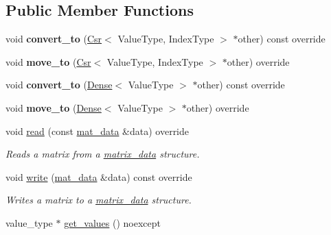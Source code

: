 \subsection*{Public Member Functions}
\begin{DoxyCompactItemize}
\item 
\mbox{\label{classgko_1_1matrix_1_1Coo_a209277e9e7c7fe02c810524f758b96e0}} 
void {\bfseries convert\+\_\+to} (\hyperlink{classgko_1_1matrix_1_1Csr}{Csr}$<$ Value\+Type, Index\+Type $>$ $\ast$other) const override
\item 
\mbox{\label{classgko_1_1matrix_1_1Coo_a69d13086e01d54027191308f01fe7853}} 
void {\bfseries move\+\_\+to} (\hyperlink{classgko_1_1matrix_1_1Csr}{Csr}$<$ Value\+Type, Index\+Type $>$ $\ast$other) override
\item 
\mbox{\label{classgko_1_1matrix_1_1Coo_afe1da5bbb43e64ced415d90b68e5d87d}} 
void {\bfseries convert\+\_\+to} (\hyperlink{classgko_1_1matrix_1_1Dense}{Dense}$<$ Value\+Type $>$ $\ast$other) const override
\item 
\mbox{\label{classgko_1_1matrix_1_1Coo_a0c4d89bb25548925ca9e698bdf00a946}} 
void {\bfseries move\+\_\+to} (\hyperlink{classgko_1_1matrix_1_1Dense}{Dense}$<$ Value\+Type $>$ $\ast$other) override
\item 
void \hyperlink{classgko_1_1matrix_1_1Coo_ac0d4aeb19d9f55b62bea18bad1a408f5}{read} (const \hyperlink{structgko_1_1matrix__data}{mat\+\_\+data} \&data) override
\begin{DoxyCompactList}\small\item\em Reads a matrix from a \hyperlink{structgko_1_1matrix__data}{matrix\+\_\+data} structure. \end{DoxyCompactList}\item 
void \hyperlink{classgko_1_1matrix_1_1Coo_ae193466ca1a4a3c7d1383ddc5a2701ab}{write} (\hyperlink{structgko_1_1matrix__data}{mat\+\_\+data} \&data) const override
\begin{DoxyCompactList}\small\item\em Writes a matrix to a \hyperlink{structgko_1_1matrix__data}{matrix\+\_\+data} structure. \end{DoxyCompactList}\item 
value\+\_\+type $\ast$ \hyperlink{classgko_1_1matrix_1_1Coo_a1ce59517b8d6a8eeaacfed2b19d4057a}{get\+\_\+values} () noexcept

\end{DoxyCompactItemize}

